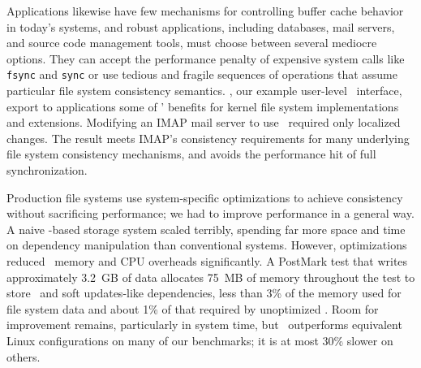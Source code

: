 Applications likewise have few mechanisms
 for controlling buffer cache behavior in today's systems, and
%
robust applications, including databases, mail servers, and source code
 management tools, must choose between several mediocre options.
%
They can accept the performance penalty of expensive system calls like
 \texttt{fsync} and \texttt{sync} or use tedious and fragile sequences
 of operations that assume particular file system consistency semantics.
%
\emph{\Patchgroups}, our example user-level \patch\ interface,
 export to applications some of \patches' benefits
 for kernel file system implementations and extensions.
%
Modifying an IMAP mail server to use \patchgroups\ required only localized
 changes.  The result meets IMAP's consistency requirements for many
 underlying file system consistency mechanisms, and avoids the performance hit of full
 synchronization.


\begin{comment}
Our file system modules impose soft updates-style \patch\ requirements by
 default, since doing so requires some knowledge of the file system's
 structures; we have also written a journal module that can change
 existing dependencies to express either full or metadata-only journaling.
%
A file system module not interested in supporting soft updates support
 could instead impose no \patch\ requirements, and count on the journal
 module to provide a consistency guarantee.


The \Kudos\ storage system implementation is decomposed entirely into
 pluggable \modules\ that manipulate \patches, hopefully making the system
 as a whole more configurable, extensible, and easier to understand.
%
Any storage system \module\ can generate \patches; other modules can examine
 them and modify them when required.
%
\Patch\ dependencies are obeyed by all other storage system layers, allowing
 them to be passed through layers such as loopback block devices.
%
As a result, the loosely-coupled \modules\ that implement a file system
 can cooperate to enforce strong and often complex consistency guarantees,
 even though each \module\ only does a small part of the work.
\end{comment}


Production file systems use system-specific optimizations to achieve
 consistency without sacrificing performance; we had to improve
 performance in a general way.
%
A naive \patch-based storage system scaled terribly,
 spending far more space and time on dependency manipulation than
 conventional systems.
%
However, optimizations reduced \patch\ memory and
 CPU overheads significantly.
%
A PostMark test that writes approximately 3.2~GB of data
 allocates 75~MB of memory throughout the test to store \patches\ and
 soft updates-like dependencies, less than 3\% of the memory used for file
 system data and about 1\% of that required by unoptimized
 \Featherstitch.
%
Room for improvement remains, particularly in system time, but
 \Featherstitch\ outperforms equivalent Linux configurations on
 many of our benchmarks; it is at most 30\% slower on others.


